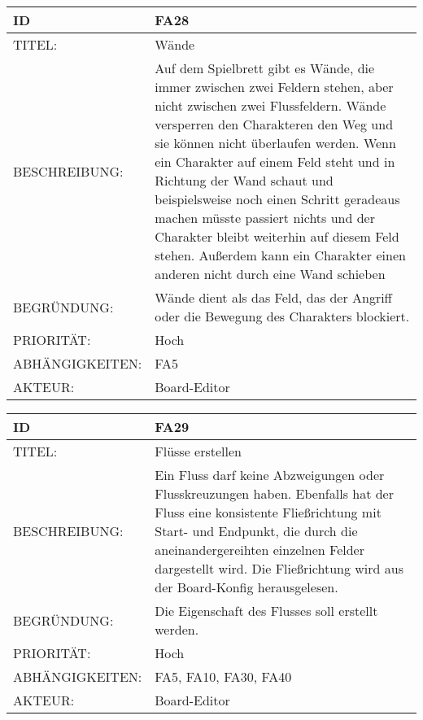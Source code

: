 \documentclass{uulm-assignment}
\begin{document}
    \begin{tabularx}{\textwidth}{|l|X |} \hline
        \textbf{ID} & \textbf{FA28} \\
        \hline
        TITEL: &  Wände\\
        \hline
        BESCHREIBUNG: & Auf dem Spielbrett gibt es Wände, die immer zwischen zwei Feldern stehen, aber nicht zwischen zwei Flussfeldern. Wände versperren den Charakteren den Weg und sie können nicht überlaufen werden. Wenn ein
Charakter auf einem Feld steht und in Richtung der Wand schaut und beispielsweise noch einen
Schritt geradeaus machen müsste passiert nichts und der Charakter bleibt weiterhin auf diesem Feld
stehen. Außerdem kann ein Charakter einen anderen nicht durch eine Wand schieben
        \\
        \hline
        BEGRÜNDUNG: & Wände dient als das Feld, das der Angriff oder die Bewegung des Charakters blockiert. \\
        \hline
        PRIORITÄT: & Hoch\\
        \hline
        ABHÄNGIGKEITEN: & FA5\\
        \hline
        AKTEUR: & Board-Editor  \\
        \hline
    \end{tabularx}
    
    \begin{tabularx}{\textwidth}{|l|X |} \hline
        \textbf{ID} & \textbf{FA29} \\
        \hline
        TITEL: & Flüsse erstellen\\
        \hline
        BESCHREIBUNG: &  Ein Fluss darf keine Abzweigungen oder Flusskreuzungen haben. Ebenfalls hat der Fluss eine konsistente
Fließrichtung mit Start- und Endpunkt, die durch die aneinandergereihten einzelnen Felder dargestellt wird. Die Fließrichtung wird aus der Board-Konfig herausgelesen. 
        \\
        \hline
        BEGRÜNDUNG: & Die Eigenschaft des Flusses soll erstellt werden.\\
        \hline
        PRIORITÄT: & Hoch\\
        \hline
        ABHÄNGIGKEITEN: & FA5, FA10, FA30, FA40\\
        \hline
        AKTEUR: & Board-Editor\\
        \hline
    \end{tabularx}
    
\end{document}

